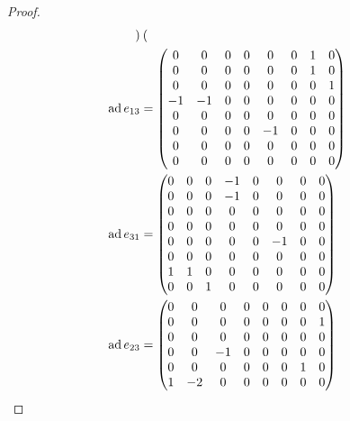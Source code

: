 \begin{proof}
\begin{align*}
\begin{pmatrix}
                  \end{pmatrix} \\
    \operatorname{ad} e_{13} &= \begin{pmatrix}
                    0 & 0 & 0 & 0 & 0 & 0 & 1 & 0 \\
                    0 & 0 & 0 & 0 & 0 & 0 & 1 & 0 \\
                    0 & 0 & 0 & 0 & 0 & 0 & 0 & 1 \\
                    -1 & -1 & 0 & 0 & 0 & 0 & 0 & 0 \\
                    0 & 0 & 0 & 0 & 0 & 0 & 0 & 0 \\
                    0 & 0 & 0 & 0 & -1 & 0 & 0 & 0 \\
                    0 & 0 & 0 & 0 & 0 & 0 & 0 & 0 \\
                    0 & 0 & 0 & 0 & 0 & 0 & 0 & 0 \\
                  \end{pmatrix} \\
    \operatorname{ad} e_{31} &= \begin{pmatrix}
                    0 & 0 & 0 & -1 & 0 & 0 & 0 & 0 \\
                    0 & 0 & 0 & -1 & 0 & 0 & 0 & 0 \\
                    0 & 0 & 0 & 0 & 0 & 0 & 0 & 0 \\
                    0 & 0 & 0 & 0 & 0 & 0 & 0 & 0 \\
                    0 & 0 & 0 & 0 & 0 & -1 & 0 & 0 \\
                    0 & 0 & 0 & 0 & 0 & 0 & 0 & 0 \\
                    1 & 1 & 0 & 0 & 0 & 0 & 0 & 0 \\
                    0 & 0 & 1 & 0 & 0 & 0 & 0 & 0 \\
                  \end{pmatrix} \\
    \operatorname{ad} e_{23} &= \begin{pmatrix}
                    0 & 0 & 0 & 0 & 0 & 0 & 0 & 0 \\
                    0 & 0 & 0 & 0 & 0 & 0 & 0 & 1 \\
                    0 & 0 & 0 & 0 & 0 & 0 & 0 & 0 \\
                    0 & 0 & -1 & 0 & 0 & 0 & 0 & 0 \\
                    0 & 0 & 0 & 0 & 0 & 0 & 1 & 0 \\
                    1 & -2 & 0 & 0 & 0 & 0 & 0 & 0 \\

\end{pmatrix}
\end{align*}
\end{proof}

